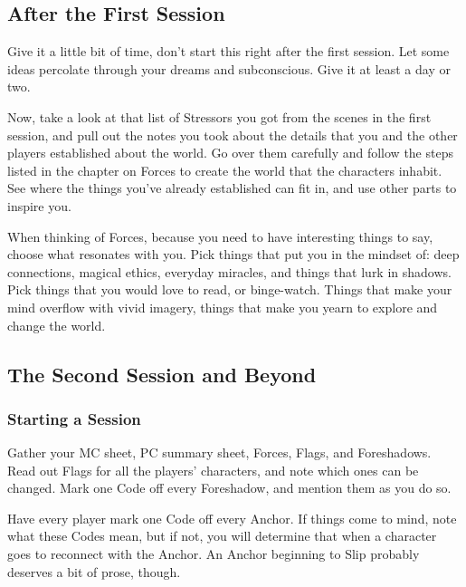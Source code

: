 \documentclass[
]{article}
\begin{document}
\hypertarget{after-the-first-session}{%
\subsection{After the First Session}\label{after-the-first-session}}

Give it a little bit of time, don't start this right after the first
session. Let some ideas percolate through your dreams and subconscious.
Give it at least a day or two.

Now, take a look at that list of Stressors you got from the scenes in
the first session, and pull out the notes you took about the details
that you and the other players established about the world. Go over them
carefully and follow the steps listed in the chapter on Forces to create
the world that the characters inhabit. See where the things you've
already established can fit in, and use other parts to inspire you.

When thinking of Forces, because you need to have interesting things to
say, choose what resonates with you. Pick things that put you in the
mindset of: deep connections, magical ethics, everyday miracles, and
things that lurk in shadows. Pick things that you would love to read, or
binge-watch. Things that make your mind overflow with vivid imagery,
things that make you yearn to explore and change the world.

\hypertarget{the-second-session-and-beyond}{%
\subsection{The Second Session and
Beyond}\label{the-second-session-and-beyond}}

\hypertarget{starting-a-session-1}{%
\subsubsection{Starting a Session}\label{starting-a-session-1}}

Gather your MC sheet, PC summary sheet, Forces, Flags, and Foreshadows.
Read out Flags for all the players' characters, and note which ones can
be changed. Mark one Code off every Foreshadow, and mention them as you
do so.

Have every player mark one Code off every Anchor. If things come to
mind, note what these Codes mean, but if not, you will determine that
when a character goes to reconnect with the Anchor. An Anchor beginning
to Slip probably deserves a bit of prose, though.
\end{document}
